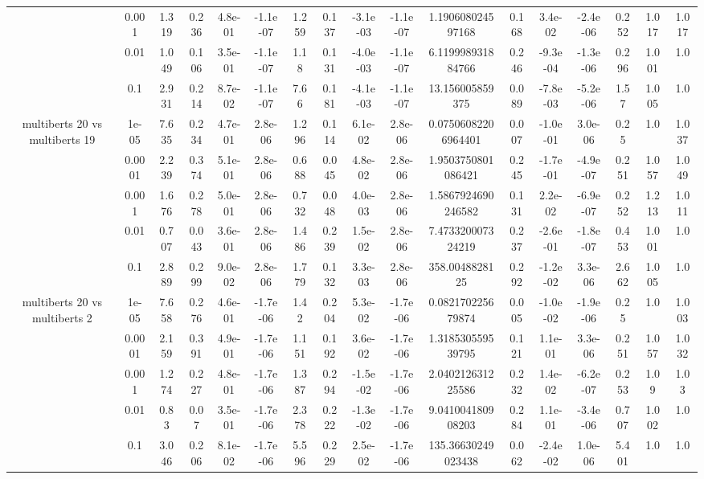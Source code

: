 \begin{tabular}{|c|c|c|c|c|c|c|c|c|c|c|c|c|c|c|c|c|}
 & 0.001 & 1.319 & 0.236 & 4.8e-01 & -1.1e-07 & 1.259 & 0.137 & -3.1e-03 & -1.1e-07 & 1.190608024597168 & 0.168 & 3.4e-02 & -2.4e-06 & 0.252 & 1.017 & 1.017 \\
 & 0.01 & 1.049 & 0.106 & 3.5e-01 & -1.1e-07 & 1.18 & 0.131 & -4.0e-03 & -1.1e-07 & 6.119998931884766 & 0.246 & -9.3e-04 & -1.3e-06 & 0.296 & 1.001 & 1.0 \\
 & 0.1 & 2.931 & 0.214 & 8.7e-02 & -1.1e-07 & 7.66 & 0.181 & -4.1e-03 & -1.1e-07 & 13.156005859375 & 0.089 & -7.8e-03 & -5.2e-06 & 1.57 & 1.005 & 1.0 \\
\hline
\multirow{5}{*}{multiberts 20 vs multiberts 19} & 1e-05 & 7.635 & 0.234 & 4.7e-01 & 2.8e-06 & 1.296 & 0.114 & 6.1e-02 & 2.8e-06 & 0.07506082206964401 & 0.007 & -1.0e-01 & 3.0e-06 & 0.25 & 1.0 & 1.037 \\
 & 0.0001 & 2.239 & 0.374 & 5.1e-01 & 2.8e-06 & 0.688 & 0.045 & 4.8e-02 & 2.8e-06 & 1.9503750801086421 & 0.245 & -1.7e-01 & -4.9e-07 & 0.251 & 1.057 & 1.049 \\
 & 0.001 & 1.676 & 0.278 & 5.0e-01 & 2.8e-06 & 0.732 & 0.048 & 4.0e-03 & 2.8e-06 & 1.5867924690246582 & 0.131 & 2.2e-02 & -6.9e-07 & 0.252 & 1.213 & 1.011 \\
 & 0.01 & 0.707 & 0.043 & 3.6e-01 & 2.8e-06 & 1.486 & 0.239 & 1.5e-02 & 2.8e-06 & 7.473320007324219 & 0.237 & -2.6e-01 & -1.8e-07 & 0.453 & 1.001 & 1.0 \\
 & 0.1 & 2.889 & 0.299 & 9.0e-02 & 2.8e-06 & 1.779 & 0.132 & 3.3e-03 & 2.8e-06 & 358.0048828125 & 0.292 & -1.2e-02 & 3.3e-06 & 2.662 & 1.005 & 1.0 \\
\hline
\multirow{5}{*}{multiberts 20 vs multiberts 2} & 1e-05 & 7.658 & 0.276 & 4.6e-01 & -1.7e-06 & 1.42 & 0.204 & 5.3e-02 & -1.7e-06 & 0.082170225679874 & 0.005 & -1.0e-02 & -1.9e-06 & 0.25 & 1.0 & 1.003 \\
 & 0.0001 & 2.159 & 0.391 & 4.9e-01 & -1.7e-06 & 1.151 & 0.192 & 3.6e-02 & -1.7e-06 & 1.318530559539795 & 0.121 & 1.1e-01 & 3.3e-06 & 0.251 & 1.057 & 1.032 \\
 & 0.001 & 1.274 & 0.227 & 4.8e-01 & -1.7e-06 & 1.387 & 0.294 & -1.5e-02 & -1.7e-06 & 2.040212631225586 & 0.232 & 1.4e-02 & -6.2e-07 & 0.253 & 1.09 & 1.03 \\
 & 0.01 & 0.83 & 0.07 & 3.5e-01 & -1.7e-06 & 2.378 & 0.222 & -1.3e-02 & -1.7e-06 & 9.041004180908203 & 0.284 & 1.1e-01 & -3.4e-06 & 0.707 & 1.002 & 1.0 \\
 & 0.1 & 3.046 & 0.206 & 8.1e-02 & -1.7e-06 & 5.596 & 0.229 & 2.5e-02 & -1.7e-06 & 135.36630249023438 & 0.062 & -2.4e-02 & 1.0e-06 & 5.401 & 1.0 & 1.0 \\

\end{tabular}

